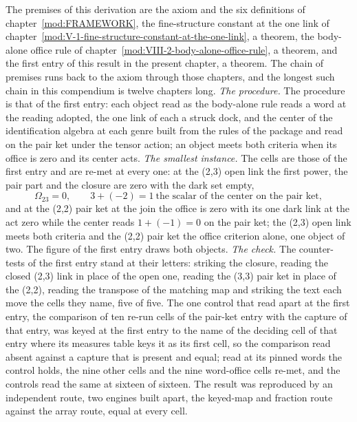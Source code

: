 \begin{chproof}
The premises of this derivation are the axiom and the six definitions of chapter~\ref{mod:FRAMEWORK}, the fine-structure constant at the one link of chapter~\ref{mod:V-1-fine-structure-constant-at-the-one-link}, a theorem, the body-alone office rule of chapter~\ref{mod:VIII-2-body-alone-office-rule}, a theorem, and the first entry of this result in the present chapter, a theorem. The chain of premises runs back to the axiom through those chapters, and the longest such chain in this compendium is twelve chapters long.
\textit{The procedure.} The procedure is that of the first entry: each object read as the body-alone rule reads a word at the reading adopted, the one link of each a struck dock, and the center of the identification algebra at each genre built from the rules of the package and read on the pair ket under the tensor action; an object meets both criteria when its office is zero and its center acts.
\textit{The smallest instance.} The cells are those of the first entry and are re-met at every one: at the (2,3) open link the first power, the pair part and the closure are zero with the dark set empty,
\begin{equation} \Omega_{23} = 0, \qquad 3 + (-2) = 1 \ \text{the scalar of the center on the pair ket}, \end{equation}
and at the (2,2) pair ket at the join the office is zero with its one dark link at the act zero while the center reads $1 + (-1) = 0$ on the pair ket; the (2,3) open link meets both criteria and the (2,2) pair ket the office criterion alone, one object of two. The figure of the first entry draws both objects.
\textit{The check.} The counter-tests of the first entry stand at their letters: striking the closure, reading the closed (2,3) link in place of the open one, reading the (3,3) pair ket in place of the (2,2), reading the transpose of the matching map and striking the text each move the cells they name, five of five. The one control that read apart at the first entry, the comparison of ten re-run cells of the pair-ket entry with the capture of that entry, was keyed at the first entry to the name of the deciding cell of that entry where its measures table keys it as its first cell, so the comparison read absent against a capture that is present and equal; read at its pinned words the control holds, the nine other cells and the nine word-office cells re-met, and the controls read the same at sixteen of sixteen. The result was reproduced by an independent route, two engines built apart, the keyed-map and fraction route against the array route, equal at every cell.

\end{chproof}
